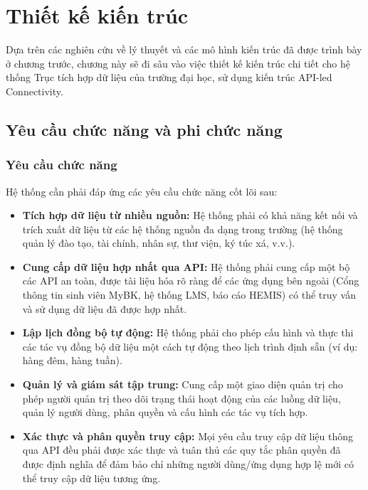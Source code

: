 \chapter{Thiết kế kiến trúc}

Dựa trên các nghiên cứu về lý thuyết và các mô hình kiến trúc đã được trình bày ở chương trước, chương này sẽ đi sâu vào việc thiết kế kiến trúc chi tiết cho hệ thống Trục tích hợp dữ liệu của trường đại học, sử dụng kiến trúc API-led Connectivity. 

\section{Yêu cầu chức năng và phi chức năng}
\subsection{Yêu cầu chức năng}
Hệ thống cần phải đáp ứng các yêu cầu chức năng cốt lõi sau:
\begin{itemize}
    \item \textbf{Tích hợp dữ liệu từ nhiều nguồn:} Hệ thống phải có khả năng kết nối và trích xuất dữ liệu từ các hệ thống nguồn đa dạng trong trường (hệ thống quản lý đào tạo, tài chính, nhân sự, thư viện, ký túc xá, v.v.).
    \item \textbf{Cung cấp dữ liệu hợp nhất qua API:} Hệ thống phải cung cấp một bộ các API an toàn, được tài liệu hóa rõ ràng để các ứng dụng bên ngoài (Cổng thông tin sinh viên MyBK, hệ thống LMS, báo cáo HEMIS) có thể truy vấn và sử dụng dữ liệu đã được hợp nhất.
    \item \textbf{Lập lịch đồng bộ tự động:} Hệ thống phải cho phép cấu hình và thực thi các tác vụ đồng bộ dữ liệu một cách tự động theo lịch trình định sẵn (ví dụ: hàng đêm, hàng tuần).
    \item \textbf{Quản lý và giám sát tập trung:} Cung cấp một giao diện quản trị cho phép người quản trị theo dõi trạng thái hoạt động của các luồng dữ liệu, quản lý người dùng, phân quyền và cấu hình các tác vụ tích hợp.
    \item \textbf{Xác thực và phân quyền truy cập:} Mọi yêu cầu truy cập dữ liệu thông qua API đều phải được xác thực và tuân thủ các quy tắc phân quyền đã được định nghĩa để đảm bảo chỉ những người dùng/ứng dụng hợp lệ mới có thể truy cập dữ liệu tương ứng.
\end{itemize}

